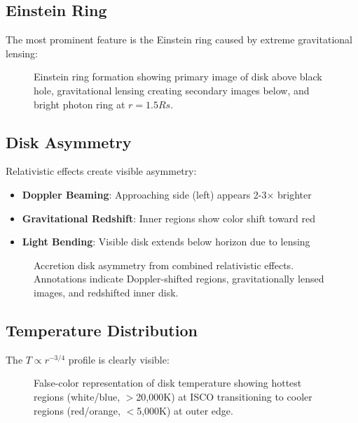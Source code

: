 \documentclass[12pt,a4paper]{article}
\theoremstyle{definition}
\theoremstyle{remark}
\begin{document}
\subsection{Einstein Ring}

The most prominent feature is the Einstein ring caused by extreme gravitational lensing:

\begin{figure}[H]
    \centering
    \caption{Einstein ring formation showing primary image of disk above black hole, gravitational lensing creating secondary images below, and bright photon ring at $r = 1.5Rs$.}
    \label{fig:einstein_ring}
\end{figure}

\subsection{Disk Asymmetry}

Relativistic effects create visible asymmetry:

\begin{itemize}
    \item \textbf{Doppler Beaming}: Approaching side (left) appears 2-3× brighter
    \item \textbf{Gravitational Redshift}: Inner regions show color shift toward red
    \item \textbf{Light Bending}: Visible disk extends below horizon due to lensing
\end{itemize}

\begin{figure}[H]
    \centering
    \caption{Accretion disk asymmetry from combined relativistic effects. Annotations indicate Doppler-shifted regions, gravitationally lensed images, and redshifted inner disk.}
    \label{fig:disk_asymmetry}
\end{figure}

\subsection{Temperature Distribution}

The $T \propto r^{-3/4}$ profile is clearly visible:

\begin{figure}[H]
    \centering
    \caption{False-color representation of disk temperature showing hottest regions (white/blue, $>$20,000K) at ISCO transitioning to cooler regions (red/orange, $<$5,000K) at outer edge.}
    \label{fig:temperature_map}
\end{figure}
\end{document}
